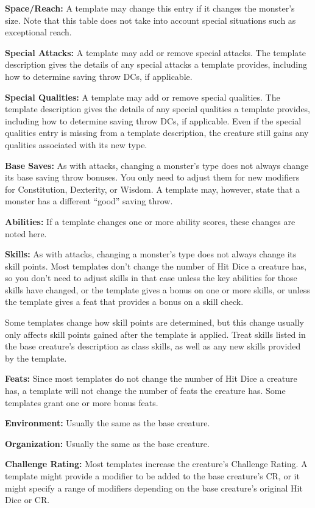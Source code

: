 \documentclass{article}
\begin{document}
\textbf{Space/Reach:} A template may change this entry if it changes the monster's 
size. Note that this table does not take into account special situations such as 
exceptional reach.

\textbf{Special Attacks:} A template may add or remove special attacks. The template 
description gives the details of any special attacks a template provides, including 
how to determine saving throw DCs, if applicable.

\textbf{Special Qualities:} A template may add or remove special qualities. The 
template description gives the details of any special qualities a template provides, 
including how to determine saving throw DCs, if applicable. Even if the special 
qualities entry is missing from a template description, the creature still gains 
any qualities associated with its new type.

\textbf{Base Saves:} As with attacks, changing a monster's type does not always 
change its base saving throw bonuses. You only need to adjust them for new modifiers 
for Constitution, Dexterity, or Wisdom. A template may, however, state that a monster 
has a different ``good'' saving throw.

\textbf{Abilities:} If a template changes one or more ability scores, these changes 
are noted here.

\textbf{Skills: }As with attacks, changing a monster's type does not always change 
its skill points. Most templates don't change the number of Hit Dice a creature 
has, so you don't need to adjust skills in that case unless the key abilities for 
those skills have changed, or the template gives a bonus on one or more skills, 
or unless the template gives a feat that provides a bonus on a skill check. 

Some templates change how skill points are determined, but this change usually 
only affects skill points gained after the template is applied. Treat skills listed 
in the base creature's description as class skills, as well as any new skills provided 
by the template. 

\textbf{Feats:} Since most templates do not change the number of Hit Dice a creature 
has, a template will not change the number of feats the creature has. Some templates 
grant one or more bonus feats.

\textbf{Environment:} Usually the same as the base creature.

\textbf{Organization:} Usually the same as the base creature.

\textbf{Challenge Rating:} Most templates increase the creature's Challenge Rating. 
A template might provide a modifier to be added to the base creature's CR, or it 
might specify a range of modifiers depending on the base creature's original Hit 
Dice or CR.
\end{document}
